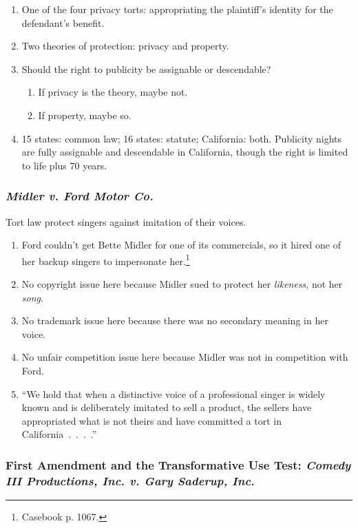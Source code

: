 \begin{enumerate}
    \item One of the four privacy torts: appropriating the plaintiff's 
    identity for the defendant's benefit.
    \item Two theories of protection: privacy and property.
    \item Should the right to publicity be assignable or descendable?
    \begin{enumerate}
        \item If privacy is the theory, maybe not.
        \item If property, maybe so.
    \end{enumerate}
    \item 15 states: common law; 16 states: statute; California: both. 
    Publicity nights are fully assignable and descendable in California, 
    though the right is limited to life plus 70 years.
\end{enumerate}

\subsubsection{\emph{Midler v. Ford Motor Co.}}

Tort law protect singers against imitation of their voices.

\begin{enumerate}
    \item Ford couldn't get Bette Midler for one of its commercials, so it 
    hired one of her backup singers to impersonate her.\footnote{Casebook p. 
    1067.}
    \item No copyright issue here because Midler sued to protect her 
    \emph{likeness}, not her \emph{song}.
    \item No trademark issue here because there was no secondary meaning in 
    her voice.
    \item No unfair competition issue here because Midler was not in 
    competition with Ford.
    \item ``We hold that when a distinctive voice of a professional singer is 
    widely known and is deliberately imitated to sell a product, the sellers 
    have appropriated what is not theirs and have committed a tort in 
    California~.~.~.~.''
\end{enumerate}

\subsubsection{First Amendment and the Transformative Use Test: \emph{Comedy 
III Productions, Inc. v. Gary Saderup, Inc.}}

